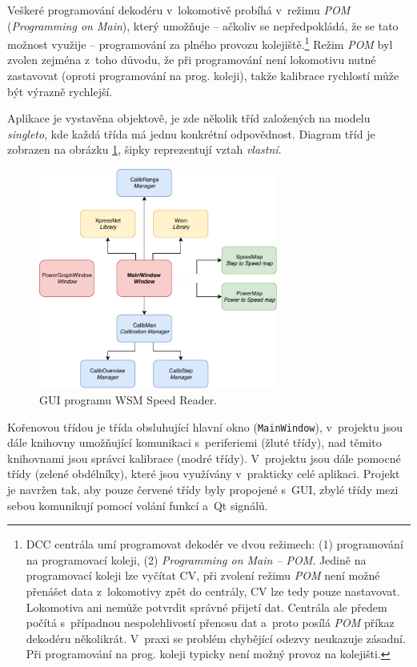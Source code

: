 Veškeré programování dekodéru v~lokomotivě probíhá v~režimu \textit{POM}
(\textit{Programming on Main}), který umožňuje -- ačkoliv se nepředpokládá, že
se tato možnost využije -- programování za plného provozu
kolejiště.\footnote{DCC centrála umí programovat dekodér ve dvou režimech: (1)
programování na programovací koleji, (2) \textit{Programming on Main -- POM}.
Jedině na programovací koleji lze vyčítat CV, při zvolení režimu \textit{POM}
není možné přenášet data z~lokomotivy zpět do centrály, CV lze tedy pouze
nastavovat. Lokomotiva ani nemůže potvrdit správné přijetí dat. Centrála ale
předem počítá s~případnou nespolehlivostí přenosu dat a~proto posílá
\textit{POM} příkaz dekodéru několikrát. V~praxi se problém chybějící odezvy
neukazuje zásadní. Při programování na prog. koleji typicky není možný provoz
na kolejišti.} Režim \textit{POM} byl zvolen zejména z~toho důvodu, že při
programování není lokomotivu nutné zastavovat (oproti programování na prog.
koleji), takže kalibrace rychlostí může být výrazně rychlejší.

Aplikace je vystavěna objektově, je zde několik tříd založených na modelu
\textit{singleto}, kde každá třída má jednu konkrétní odpovědnost. Diagram
tříd je zobrazen na obrázku \ref{fig:ac-classes}, šipky reprezentují vztah
\textit{vlastní}.

\begin{figure}[h]
\includegraphics[width=0.7\textwidth]{data/ac_classes.pdf}
\caption{GUI programu WSM Speed Reader.}
\label{fig:ac-classes}
\end{figure}

Kořenovou třídou je třída obsluhující hlavní okno (\texttt{MainWindow}),
v~projektu jsou dále knihovny umožňující komunikaci s~periferiemi (žluté třídy),
nad těmito knihovnami jsou správci kalibrace (modré třídy). V~projektu jsou
dále pomocné třídy (zelené obdélníky), které jsou využívány v~prakticky celé
aplikaci. Projekt je navržen tak, aby pouze červené třídy byly propojené
s~GUI, zbylé třídy mezi sebou komunikují pomocí volání funkcí a~Qt signálů.

